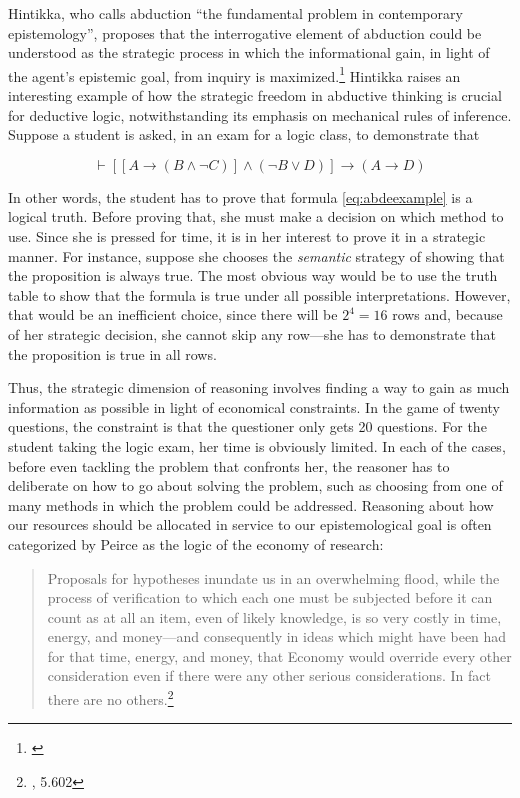 Hintikka, who calls abduction ``the fundamental problem in contemporary epistemology'', proposes that the interrogative element of abduction could be understood as the strategic process in which the informational gain, in light of the agent's epistemic goal, from inquiry is maximized.\footnote{\cite{hintikka}} Hintikka raises an interesting example of how the strategic freedom in abductive thinking is crucial for deductive logic, notwithstanding its emphasis on mechanical rules of inference. Suppose a student is asked, in an exam for a logic class, to demonstrate that

\begin{equation}
	\vdash [[A\to(B\wedge \neg C)] \wedge (\neg B \vee D) ]\to (A\to D)
	\label{eq:abdeexample}
\end{equation}

 
 
 In other words, the student has to prove that formula \ref{eq:abdeexample} is a logical truth. Before proving that, she must make a decision on which method to use. Since she is pressed for time, it is in her interest to prove it in a strategic manner. For instance, suppose she chooses the \emph{semantic} strategy of showing that the proposition is  always true. The most obvious way would be to use the truth table to show that the formula is true under all possible interpretations. However, that would be an inefficient choice, since there will be $2^4=16$ rows and, because of her strategic decision, she cannot skip any row---she has to demonstrate that the proposition is true in all rows. 


Thus, the strategic dimension of reasoning involves finding a way to gain as much information as possible in light of economical constraints. In the game of twenty questions, the constraint is that the questioner only gets 20 questions. For the student taking the logic exam, her time is obviously limited. In each of the cases, before even tackling the problem that confronts her, the reasoner has to deliberate on how to go about solving the problem, such as choosing from one of many methods in which the problem could be addressed. Reasoning about how our resources should be allocated in service to our epistemological goal is often categorized by Peirce as the logic of the economy of research:

\begin{quote}
Proposals for hypotheses inundate us in an overwhelming flood, while the process of verification to which each one must be subjected before it can count as at all an item, even of likely knowledge, is so very costly in time, energy, and money---and consequently in ideas which might have been had for that time, energy, and money, that Economy would override every other consideration even if there were any other serious considerations. In fact there are no others.\footnote{\cite{CP}, 5.602}	
\end{quote}

